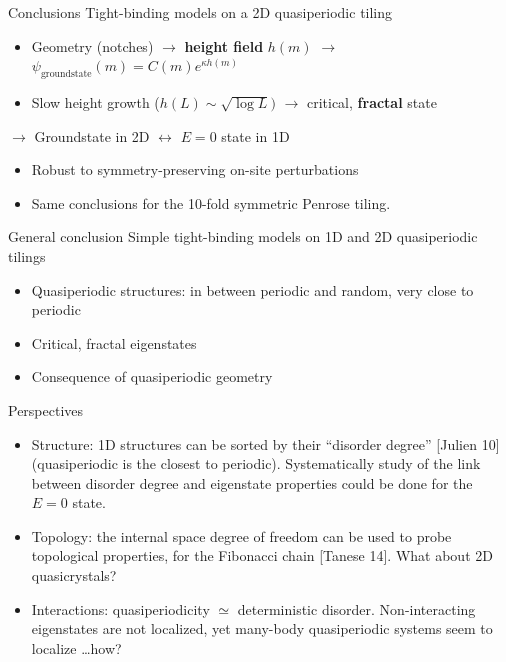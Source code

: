 \begin{frame}{Conclusions}
Tight-binding models on a 2D quasiperiodic tiling
\begin{itemize}
	\item Geometry (notches) $\to$ \textbf{height field} $h(m)$ $\to$ $\psi_\text{groundstate}(m) = C(m) e^{\kappa h(m)}$
	\item Slow height growth ($h(L) \sim \sqrt{\log L})$ $\to$ critical, \textbf{fractal} state
\end{itemize}
$\to$ Groundstate in 2D $\leftrightarrow$ $E=0$ state in 1D
\begin{itemize}
	\item Robust to symmetry-preserving on-site perturbations
	\item Same conclusions for the 10-fold symmetric Penrose tiling.
\end{itemize}
\end{frame}

\begin{frame}{General conclusion}
Simple tight-binding models on 1D and 2D quasiperiodic tilings
\begin{itemize}
	\item Quasiperiodic structures: in between periodic and random, very close to periodic
	\item Critical, fractal eigenstates
	\item Consequence of quasiperiodic geometry
\end{itemize}
Perspectives
\begin{itemize}
	\item Structure: 1D structures can be sorted by their ``disorder degree'' [Julien 10] (quasiperiodic is the closest to periodic). Systematically study of the link between disorder degree and eigenstate properties could be done for the $E=0$ state.
	\item Topology: the internal space degree of freedom can be used to probe topological properties, for the Fibonacci chain [Tanese \etal{} 14]. What about 2D quasicrystals?
	\item Interactions: quasiperiodicity $\simeq$ deterministic disorder. Non-interacting eigenstates are not localized, yet many-body quasiperiodic systems seem to localize \dots how?
\end{itemize}
\end{frame}

%
%
